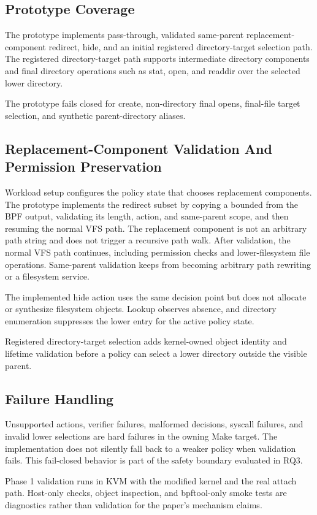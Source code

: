 \subsection{Prototype Coverage}

The prototype implements pass-through, validated same-parent
replacement-component redirect, hide, and an initial registered directory-target
selection path. The registered directory-target path supports intermediate directory
components and final directory operations such as stat, 
open, and readdir over the selected lower directory.

The prototype fails closed for create, non-directory final opens, final-file
target selection, and synthetic parent-directory aliases.

\subsection{Replacement-Component Validation And Permission Preservation}

Workload setup configures the policy state that chooses replacement components.
The prototype implements the redirect subset by copying a bounded
 from the BPF output, validating its length, action, and
same-parent scope, and then resuming the normal VFS path. The replacement
component is not an
arbitrary path string and does not trigger a recursive path walk. After
validation, the normal VFS path continues, including permission checks and
lower-filesystem file operations. Same-parent validation keeps \namei from
becoming arbitrary path rewriting or a filesystem service.

The implemented hide action uses the same decision point but does not allocate
or synthesize filesystem objects. Lookup observes absence, and directory
enumeration suppresses the lower entry for the active policy state.

Registered directory-target selection adds kernel-owned object identity and lifetime
validation before a policy can select a lower directory outside the visible
parent.

\subsection{Failure Handling}

Unsupported actions, verifier failures, malformed decisions, syscall failures,
and invalid lower selections are hard failures in the owning Make target. The
implementation does not silently fall back to a weaker policy when validation
fails. This fail-closed behavior is part of the safety boundary evaluated in
RQ3.

Phase 1 validation runs in KVM with the modified kernel and the real
 attach path. Host-only checks, object inspection, and
bpftool-only smoke tests are diagnostics rather than validation for the paper's
mechanism claims.
